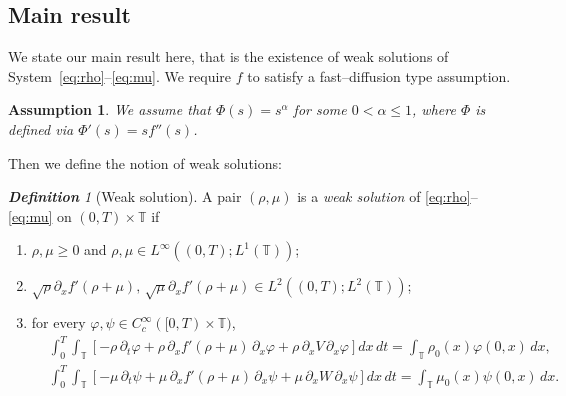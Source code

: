 \documentclass[a4paper,twosided, 11pt]{article}
\newcommand{\R}{\mathbb{R}}
\newcommand {\T}  { {\mathbb{T}} }
\theoremstyle{plain}
\newtheorem{ass}[thm]{Assumption}
\theoremstyle{remark}
\newtheorem{definition}[thm]{\bf Definition}
\numberwithin{equation}{section}
\begin{document}
\subsection{Main result}

We state our main result here, that is the existence of weak solutions of System~\eqref{eq:rho}--\eqref{eq:mu}.  We require $f$ to satisfy a fast--diffusion type assumption. 

\begin{ass}\label{ass:nonlinearity}
We assume that $\Phi(s)=s^{\alpha}$ for some $0< \alpha\le 1 $, where $\Phi$ is defined via $\Phi'(s)=sf''(s)$.
\end{ass}



Then we define the notion of weak solutions:

\begin{definition}[Weak solution]\label{def}
A pair $(\rho,\mu)$ is a \emph{weak solution} of
\eqref{eq:rho}--\eqref{eq:mu} on $(0,T)\times\T$ if
\begin{enumerate}
\item $\rho,\mu\ge0$ and
      $\rho,\mu\in L^\infty((0,T);L^1(\T))$;
\item $\sqrt{\rho}\partial_{x}f'(\rho+\mu),\,  \sqrt{\mu}\partial_x f'(\rho+\mu)\in L^{2}((0,T); L^{2}(\T))$;
\item for every $\varphi,\psi\in C_c^\infty([0,T)\times\T)$,
      \begin{align*}
        &\int_{0}^{T}\int_{\T}
        \left[-\rho\,\partial_t\varphi
              +\rho\,\partial_x f'(\rho+\mu)\,\partial_x\varphi
              +\rho\,\partial_xV\,\partial_x\varphi\right]dx\,dt
          =\int_{\T}\rho_0(x)\varphi(0,x)\,dx,\\
        &\int_{0}^{T}\int_{\T}
        \left[-\mu\,\partial_t\psi
              +\mu\,\partial_x f'(\rho+\mu)\,\partial_x\psi
              +\mu\,\partial_xW\,\partial_x\psi\right]dx\,dt
          =\int_{\T}\mu_0(x)\psi(0,x)\,dx.
      \end{align*}
\end{enumerate}
\end{definition}
\end{document}

